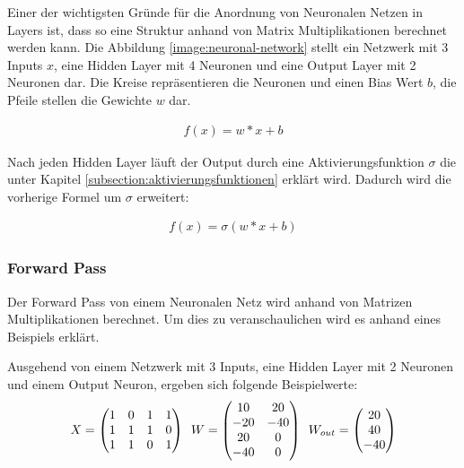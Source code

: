 
Einer der wichtigsten Gründe für die Anordnung von Neuronalen Netzen in Layers ist, dass so eine Struktur anhand von Matrix Multiplikationen
berechnet werden kann. Die Abbildung \ref{image:neuronal-network} stellt ein Netzwerk mit 3 Inputs $ x $, eine Hidden Layer mit 4 Neuronen
und eine Output Layer mit 2 Neuronen dar. Die Kreise repräsentieren die Neuronen und einen Bias Wert $ b $,
die Pfeile stellen die Gewichte $ w $ dar.

\begin{align}
  f(x) = w*x + b
\end{align}

Nach jeden Hidden Layer läuft der Output durch eine Aktivierungsfunktion $ \sigma $ die unter Kapitel \ref{subsection:aktivierungsfunktionen} erklärt wird.
Dadurch wird die vorherige Formel um $ \sigma $ erweitert:

\begin{align}
  f(x) = \sigma( w*x + b)
\end{align}

\subsubsection{Forward Pass}
Der Forward Pass von einem Neuronalen Netz wird anhand von Matrizen Multiplikationen berechnet. Um dies zu veranschaulichen wird
es anhand eines Beispiels erklärt.

Ausgehend von einem Netzwerk mit 3 Inputs, eine Hidden Layer mit 2 Neuronen und einem Output Neuron, ergeben sich folgende Beispielwerte:
\begin{equation} 
  \vspace{5pt}
  X = \begin{pmatrix}
    1 &0 &1 &1 \\
    1 &1 &1 &0 \\
    1 &1 &0 &1
  \end{pmatrix} 
  \hspace{5pt}
  W = \begin{pmatrix}
    10 &20 \\
    -20 &-40 \\
    20 &0 \\
    -40 &0
  \end{pmatrix}
  \hspace{5pt}
  W_{out} = \begin{pmatrix}
    20 \\
    40 \\
    -40
  \end{pmatrix}
\end{equation}

